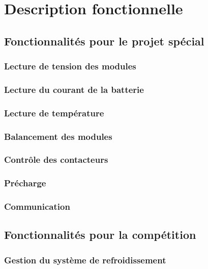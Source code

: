 
\section{Description fonctionnelle}

	\subsection{Fonctionnalités pour le projet spécial}
		\subsubsection{Lecture de tension des modules}
		
		\subsubsection{Lecture du courant de la batterie}
		
		\subsubsection{Lecture de température}
		
		\subsubsection{Balancement des modules}
		
		\subsubsection{Contrôle des contacteurs}
		
		\subsubsection{Précharge}
		
		\subsubsection{Communication}
	
	\subsection{Fonctionnalités pour la compétition}
		\subsubsection{Gestion du système de refroidissement}
		
